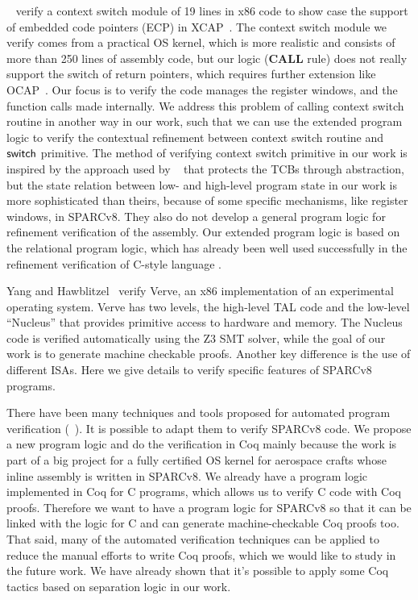 ~\cite{ctxm} verify a context switch module of 19 lines
in x86 code to show case the support of embedded
code pointers (ECP) in XCAP~\cite{xcap}. The context switch
module we verify comes from a practical OS kernel,
which is more realistic and consists of more than 250 lines
of assembly code, but our logic (\textbf{CALL} rule) 
does not really support the switch of return pointers,   
which requires further extension like OCAP~\cite{FengTLDI07}. 
Our focus is to verify the
code manages the register windows, and the function calls made internally. 
We address this problem of calling context switch routine in 
another way in our work, such that we can use the extended 
program logic to verify the contextual refinement between 
context switch routine and $\mathsf{switch}{}$ primitive. 
The method of verifying context switch primitive in our work is 
inspired by the approach used by ~\cite{ctxmGuo}
that protects the TCBs through abstraction, but the state 
relation between low- and high-level program state in our work is more 
sophisticated than theirs, because of some specific mechanisms, 
like register windows, in SPARCv8. 
They also do not develop a general program 
logic for refinement verification of the assembly.  
Our extended program logic is based on the relational program logic, 
which has already been well used 
successfully in the refinement verification 
of C-style language \cite{Xu16cav,liang13pldi,liang14lics}.  

Yang and Hawblitzel~\cite{YangPLDI10} verify Verve, an x86 
implementation of an experimental operating system. Verve has two 
levels, the high-level TAL code and the low-level ``Nucleus'' 
that provides primitive access to hardware and memory. 
The Nucleus code is verified automatically using the Z3 SMT solver,
while the goal of our work is to generate machine checkable proofs.
Another key difference is the use of different ISAs. Here
we give details to verify specific features of SPARCv8 programs.

There have been many techniques and tools proposed for automated
program verification (\eg~\cite{SymbolicExecutionSpLogic,Smallfoot}).
It is possible to adapt them to verify SPARCv8 code.
We propose a new program logic and do the verification in Coq mainly
because the work is part of a big project for a fully certified OS 
kernel for aerospace crafts whose inline assembly is written in 
SPARCv8. We already have a program logic implemented in Coq for 
C programs, which allows us to verify C code with Coq proofs. 
Therefore we want to have a program logic for SPARCv8 so that 
it can be linked with the
logic for C and can generate machine-checkable Coq proofs too.
That said, many of the automated verification techniques can
be applied to reduce the manual efforts to write Coq proofs,
which we would like to study in the future work. 
We have already shown that it's possible to apply some 
Coq tactics based on separation logic \cite{practical-tactics} 
in our work.  


